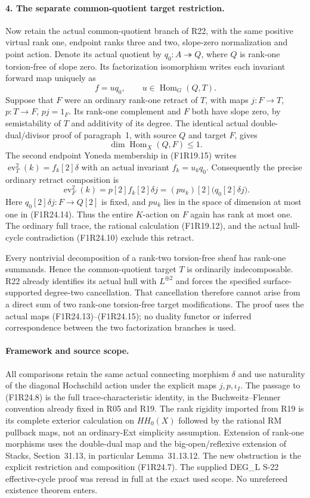 \paragraph{4. The separate common-quotient target restriction.}
Now retain the actual common-quotient branch of R22, with
the same positive virtual rank one, endpoint ranks three and
two, slope-zero normalization and point action. Denote its
actual quotient by $q_0:A\twoheadrightarrow Q$, where $Q$
is rank-one torsion-free of slope zero. Its factorization
isomorphism writes each invariant forward map uniquely as
\[
              f=u q_0,\qquad u\in\operatorname{Hom}_G(Q,T).
 \tag{F1R24.13}
\]
Suppose that $F$ were an ordinary rank-one retract of $T$,
with maps $j:F\to T$, $p:T\to F$, $pj=1_F$. Its rank-one
complement and $F$ both have slope zero, by semistability
of $T$ and additivity of its degree. The identical actual
double-dual/divisor proof of paragraph~1, with source $Q$
and target $F$, gives
\[
                       \dim\operatorname{Hom}_X(Q,F)\le1.
 \tag{F1R24.14}
\]
The second endpoint Yoneda membership in (F1R19.15) writes
$\operatorname{ev}_T^2(k)=f_k[2]\delta$ with an actual
invariant $f_k=u_kq_0$. Consequently the precise ordinary
retract composition is
\[
 \operatorname{ev}_F^2(k)
       =p[2]f_k[2]\delta j
       =(p u_k)[2]\bigl(q_0[2]\delta j\bigr).
 \tag{F1R24.15}
\]
Here $q_0[2]\delta j:F\to Q[2]$ is fixed, and
$p u_k$ lies in the space of dimension at most one in
(F1R24.14). Thus the entire $K$-action on $F$ again has
rank at most one. The ordinary full trace, the rational
calculation (F1R19.12), and the actual hull-cycle
contradiction (F1R24.10) exclude this retract.

Every nontrivial decomposition of a rank-two torsion-free
sheaf has rank-one summands. Hence the common-quotient
target $T$ is ordinarily indecomposable. R22 already
identifies its actual hull with $L^{\oplus2}$ and forces
the specified surface-supported degree-two cancellation.
That cancellation therefore cannot arise from a direct
sum of two rank-one torsion-free target modifications.
The proof uses the actual maps (F1R24.13)--(F1R24.15);
no duality functor or inferred correspondence between
the two factorization branches is used.

\paragraph{Framework and source scope.}
All comparisons retain the same actual connecting morphism
$\delta$ and use naturality of the diagonal Hochschild action
under the explicit maps $j,p,\iota_I$. The passage to
(F1R24.8) is the full trace-characteristic identity, in the
Buchweitz--Flenner convention already fixed in R05 and R19.
The rank rigidity imported from R19 is its complete exterior
calculation on $HH_0(X)$ followed by the rational RM pullback
maps, not an ordinary-Ext simplicity assumption. Extension
of rank-one morphisms uses the double-dual map and the
big-open/reflexive extension of Stacks, Section~31.13,
in particular Lemma~31.13.12. The new obstruction is the
explicit restriction and composition (F1R24.7). The supplied
DEG\_L S-22 effective-cycle proof was reread in full at the
exact used scope. No unrefereed existence theorem enters.
